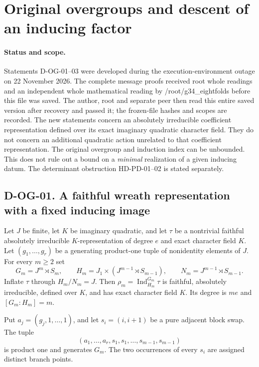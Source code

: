 \section{Original overgroups and descent of an inducing factor}
\label{sec:original-overgroups}

\paragraph{Status and scope.}
Statements D-OG-01--03 were developed during the execution-environment
outage on 22 November 2026.  The complete message proofs received root
whole readings and an independent whole mathematical reading by
/root/g34\_eightfolds before this file was saved.  The author, root and separate peer then read this entire saved version
after recovery and passed it; the frozen-file hashes and scopes are recorded.  The new statements concern
an absolutely irreducible coefficient representation defined over its
exact imaginary quadratic character field.  They do not concern an
additional quadratic action unrelated to that coefficient representation.
The original overgroup and induction index can be unbounded.  This does
not rule out a bound on a \emph{minimal} realization of a given inducing
datum.  The determinant obstruction HD-PD-01--02 is stated separately.

\subsection*{D-OG-01. A faithful wreath representation with a fixed inducing image}

\begin{proposition}[D-OG-01]
Let $J$ be finite, let $K$ be imaginary quadratic, and let $\tau$ be a
nontrivial faithful absolutely irreducible $K$-representation of degree
$e$ and exact character field $K$.  Let
$(g_1,\ldots,g_r)$ be a generating product-one tuple of nonidentity
elements of $J$.  For every $m\ge2$ set
\[
 G_m=J^m\rtimes S_m,\qquad
 H_m=J_1\times(J^{m-1}\rtimes S_{m-1}),\qquad
 N_m=J^{m-1}\rtimes S_{m-1}.
 \tag{OG.1}
\]
Inflate $\tau$ through $H_m/N_m=J$.  Then
$\rho_m=\operatorname{Ind}_{H_m}^{G_m}\tau$ is faithful, absolutely
irreducible, defined over $K$, and has exact character field $K$.
Its degree is $me$ and $[G_m:H_m]=m$.

Put $a_j=(g_j,1,\ldots,1)$, and let $s_i=(i,i+1)$ be a pure adjacent
block swap.  The tuple
\[
 (a_1,\ldots,a_r,s_1,s_1,\ldots,s_{m-1},s_{m-1})
 \tag{OG.2}
\]
is product one and generates $G_m$.  The two occurrences of every
$s_i$ are assigned distinct branch points.
\end{proposition}

